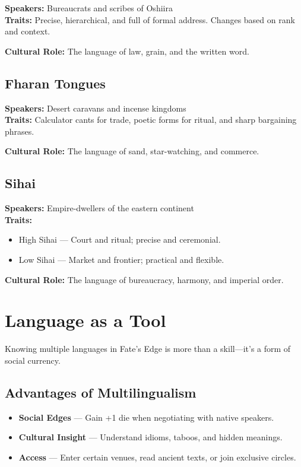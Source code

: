 \textbf{Speakers:} Bureaucrats and scribes of Oshiira \\
\textbf{Traits:} Precise, hierarchical, and full of formal address. Changes based on rank and context.

\textbf{Cultural Role:} The language of law, grain, and the written word.

\subsection*{Fharan Tongues}

\textbf{Speakers:} Desert caravans and incense kingdoms \\
\textbf{Traits:} Calculator cants for trade, poetic forms for ritual, and sharp bargaining phrases.

\textbf{Cultural Role:} The language of sand, star-watching, and commerce.

\subsection*{Sihai}

\textbf{Speakers:} Empire-dwellers of the eastern continent \\
\textbf{Traits:} 
\begin{itemize}
  \item High Sihai — Court and ritual; precise and ceremonial.
  \item Low Sihai — Market and frontier; practical and flexible.
\end{itemize}

\textbf{Cultural Role:} The language of bureaucracy, harmony, and imperial order.

\section{Language as a Tool}

Knowing multiple languages in Fate’s Edge is more than a skill—it’s a form of social currency.

\subsection*{Advantages of Multilingualism}

\begin{itemize}
  \item \textbf{Social Edges} — Gain +1 die when negotiating with native speakers.
  \item \textbf{Cultural Insight} — Understand idioms, taboos, and hidden meanings.
  \item \textbf{Access} — Enter certain venues, read ancient texts, or join exclusive circles.
\end{itemize}

